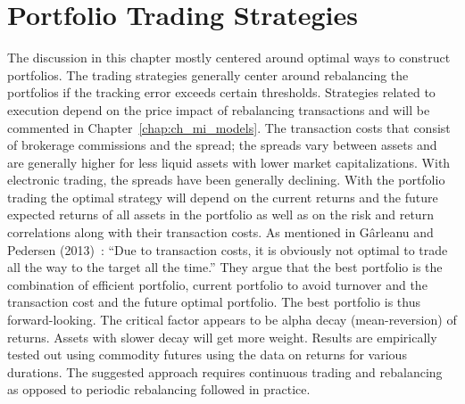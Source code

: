 \section{Portfolio Trading Strategies \label{sec:port_trad_strat}}


The discussion in this chapter mostly centered around optimal ways to construct portfolios. The trading strategies generally center around rebalancing the portfolios if the tracking error exceeds certain thresholds. Strategies related to execution depend on the price impact of rebalancing transactions and will be commented in Chapter~\ref{chap:ch_mi_models}. The transaction costs that consist of brokerage commissions and the spread; the spreads vary between assets and are generally higher for less liquid assets with lower market capitalizations. With electronic trading, the spreads have been generally declining. With the portfolio trading the optimal strategy will depend on the current returns and the future expected returns of all assets in the portfolio as well as on the risk and return correlations along with their transaction costs. As mentioned in G\^{a}rleanu and Pedersen (2013)~\cite{garlepede}: ``Due to transaction costs, it is obviously not optimal to trade all the way to the target all the time.'' They argue that the best portfolio is the combination of efficient portfolio, current portfolio to avoid turnover and the transaction cost and the future optimal portfolio. The best portfolio is thus forward-looking. The critical factor appears to be alpha decay (mean-reversion) of returns. Assets with slower decay will get more weight. Results are empirically tested out using commodity futures using the data on returns for various durations. The suggested approach requires continuous trading and rebalancing as opposed to periodic rebalancing followed in practice. 


